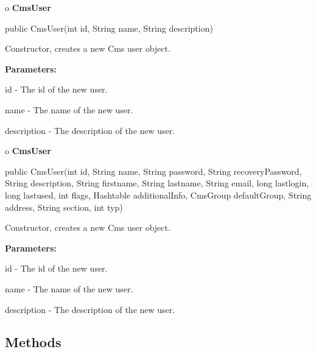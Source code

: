 o {\bf CmsUser} 

\begin{PRE}
 public CmsUser(int id,
                String name,
                String description)
\end{PRE}

\begin{description}
\htmlDD Constructor, creates a new Cms user object. 

\begin{description}
\item {\bf Parameters:}  

id - The id of the new user.  

name - The name of the new user.  

description - The description of the new user.  
\end{description}

\end{description}

o {\bf CmsUser} 

\begin{PRE}
 public CmsUser(int id,
                String name,
                String password,
                String recoveryPassword,
                String description,
                String firstname,
                String lastname,
                String email,
                long lastlogin,
                long lastused,
                int flags,
                Hashtable additionalInfo,
                CmsGroup defaultGroup,
                String address,
                String section,
                int typ)
\end{PRE}

\begin{description}
\htmlDD Constructor, creates a new Cms user object. 

\begin{description}
\item {\bf Parameters:}  

id - The id of the new user.  

name - The name of the new user.  

description - The description of the new user.  
\end{description}

\end{description}

\subsection*{  Methods }


